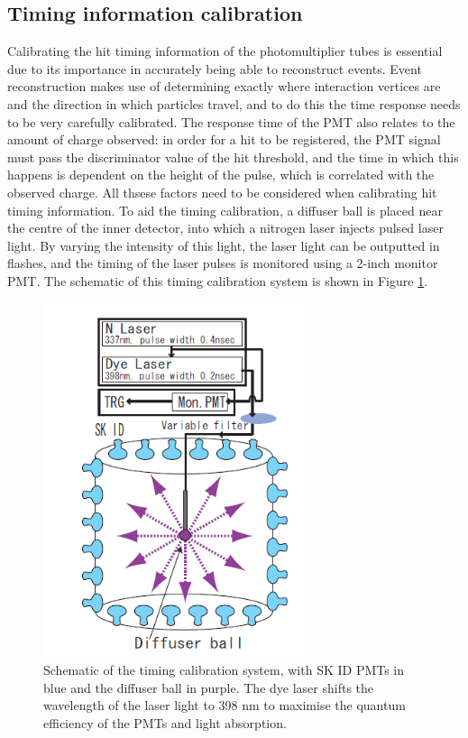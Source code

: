 \subsection{Timing information calibration}
Calibrating the hit timing information of the photomultiplier tubes is essential due to its importance in accurately being able to reconstruct events. Event reconstruction makes use of determining exactly where interaction vertices are and the direction in which particles travel, and to do this the time response needs to be very carefully calibrated. The response time of the PMT also relates to the amount of charge observed: in order for a hit to be registered, the PMT signal must pass the discriminator value of the hit threshold, and the time in which this happens is dependent on the height of the pulse, which is correlated with the observed charge. All thsese factors need to be considered when calibrating hit timing information.
\newline
To aid the timing calibration, a diffuser ball is placed near the centre of the inner detector, into which a nitrogen laser injects pulsed laser light. By varying the intensity of this light, the laser light can be outputted in flashes, and the timing of the laser pulses is monitored using a 2-inch monitor PMT. The schematic of this timing calibration system is shown in Figure \ref{fig:timecalibsystem}.

\begin{figure}
\centering
    \includegraphics[width=0.7\textwidth]{Figures/timecalibsystem.png}
\caption{Schematic of the timing calibration system, with SK ID PMTs in blue and the diffuser ball in purple. The dye laser shifts the wavelength of the laser light to 398 nm to maximise the quantum efficiency of the PMTs and light absorption.}
    \label{fig:timecalibsystem}
\end{figure}


